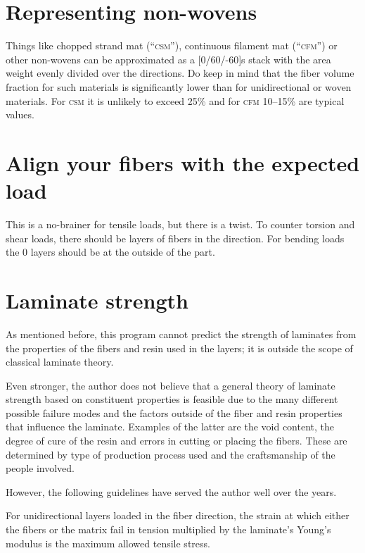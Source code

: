 \documentclass[a4paper,landscape,oneside,11pt,twocolumn]{memoir}
\begin{document}
\section{Representing non-wovens}

Things like chopped strand mat (“\textsc{csm}”), continuous filament mat
(“\textsc{cfm}”) or other non-wovens can be approximated as
a [0\textdegree/60\textdegree/-60\textdegree]s stack with the area weight
evenly divided over the directions. Do keep in mind that the fiber volume
fraction for such materials is significantly lower than for unidirectional or
woven materials. For \textsc{csm} it is unlikely to exceed 25\% and for
\textsc{cfm} 10--15\% are typical values.


\section{Align your fibers with the expected load}

This is a no-brainer for tensile loads, but there is a twist. To counter
torsion and shear loads, there should be layers of fibers in the \textdegree{} direction.  For bending loads the 0\textdegree{} layers should
be at the outside of the part.


\section{Laminate strength}

As mentioned before, this program cannot predict the strength of laminates
from the properties of the fibers and resin used in the layers; it is outside
the scope of classical laminate theory.

Even stronger, the author does not believe that a general theory of laminate
strength based on constituent properties is feasible due to the many different
possible failure modes and the factors outside of the fiber and resin
properties that influence the laminate.  Examples of the latter are the void
content, the degree of cure of the resin and errors in cutting or placing the
fibers. These are determined by type of production process used and the
craftsmanship of the people involved.

However, the following guidelines have served the author well over the years.

For unidirectional layers loaded in the fiber direction, the strain at which
either the fibers or the matrix fail in tension multiplied by the laminate's
Young's modulus is the maximum allowed tensile stress.
\end{document}
